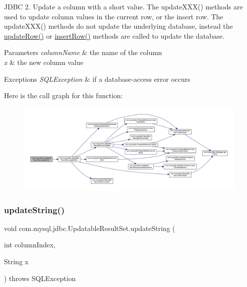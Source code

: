 J\+D\+BC 2. Update a column with a short value. The update\+X\+X\+X() methods are used to update column values in the current row, or the insert row. The update\+X\+X\+X() methods do not update the underlying database, instead the \mbox{\hyperlink{classcom_1_1mysql_1_1jdbc_1_1_updatable_result_set_a919969ba4b3c7cbc7b18605e9f31a746}{update\+Row()}} or \mbox{\hyperlink{classcom_1_1mysql_1_1jdbc_1_1_updatable_result_set_aef041f8d9d0778083716fc26652648fa}{insert\+Row()}} methods are called to update the database.


\begin{DoxyParams}{Parameters}
{\em column\+Name} & the name of the column \\
\hline
{\em x} & the new column value\\
\hline
\end{DoxyParams}

\begin{DoxyExceptions}{Exceptions}
{\em S\+Q\+L\+Exception} & if a database-\/access error occurs \\
\hline
\end{DoxyExceptions}
Here is the call graph for this function\+:
\nopagebreak
\begin{figure}[H]
\begin{center}
\leavevmode
\includegraphics[width=350pt]{classcom_1_1mysql_1_1jdbc_1_1_updatable_result_set_a6bbe60d1c6cc1b5d6b413b47eedfddf6_cgraph}
\end{center}
\end{figure}
\mbox{\label{classcom_1_1mysql_1_1jdbc_1_1_updatable_result_set_a2700e7ffdff6222d85545e1cb7019e95}} 
\subsubsection{\texorpdfstring{update\+String()}{updateString()}\hspace{0.1cm}{\footnotesize\ttfamily [1/2]}}
{\footnotesize\ttfamily void com.\+mysql.\+jdbc.\+Updatable\+Result\+Set.\+update\+String (\begin{DoxyParamCaption}\item[{int}]{column\+Index,  }\item[{String}]{x }\end{DoxyParamCaption}) throws S\+Q\+L\+Exception}

